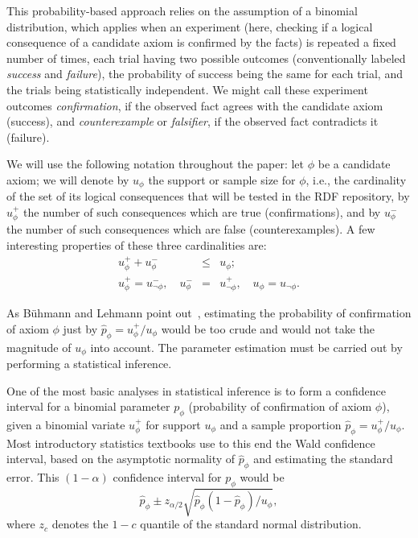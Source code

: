 \documentclass{llncs}
\begin{document}
This probability-based approach relies on the assumption of a binomial distribution, which applies when an
experiment (here, checking if a logical consequence of a candidate axiom is confirmed
by the facts) is repeated a fixed number of times, each trial having two possible outcomes
(conventionally labeled \emph{success} and \emph{failure}),
the probability of success being the same for each trial,
and the trials being statistically independent. We might call these experiment outcomes
\emph{confirmation}, if the observed fact agrees with the candidate axiom (success),
and \emph{counterexample} or \emph{falsifier}, if the observed fact contradicts it (failure).

We will use the following notation throughout the paper:
let $\phi$ be a candidate axiom; we will denote by $u_\phi$ the support or sample size for $\phi$,
i.e., the cardinality of the set of its logical consequences that will be tested in the RDF repository,
by $u_\phi^+$ the number of such consequences which are true (confirmations), and
by $u_\phi^-$ the number of such consequences which are false (counterexamples).
A few interesting properties of these three cardinalities are:
\begin{eqnarray}
  u_\phi^+ + u_\phi^- &\leq& u_\phi;\label{eq:conf-pls-expt-lt-refc} \\
  u_\phi^+ = u_{\neg\phi}^-, \quad
  u_\phi^- &=& u_{\neg\phi}^+, \quad
  u_\phi = u_{\neg\phi}.
\end{eqnarray}


As B\"uhmann and Lehmann point out~\cite{BuehmannLehmann2012},
estimating the probability of confirmation of axiom $\phi$ just by $\hat{p}_\phi = u_\phi^+/u_\phi$
would be too crude and would not take the magnitude of $u_\phi$ into account.
The parameter estimation must be carried out by performing a statistical inference.

One of the most basic analyses in statistical inference is to form a confidence interval
for a binomial parameter $p_\phi$ (probability of confirmation of axiom $\phi$), given
a binomial variate $u_\phi^+$ for support $u_\phi$ and a sample proportion $\hat{p}_\phi = u_\phi^+/u_\phi$.
Most introductory statistics textbooks use to this end the Wald confidence interval,
based on the asymptotic normality of $\hat{p}_\phi$ and estimating the standard error.
This $(1 - \alpha)$ confidence interval for $p_\phi$ would be
\begin{equation}\label{eq:Wald}
  \hat{p}_\phi \pm z_{\alpha/2}\sqrt{\hat{p}_\phi(1 - \hat{p}_\phi)/u_\phi},
\end{equation}
where $z_c$ denotes the $1 - c$ quantile of the standard normal distribution.
\end{document}
